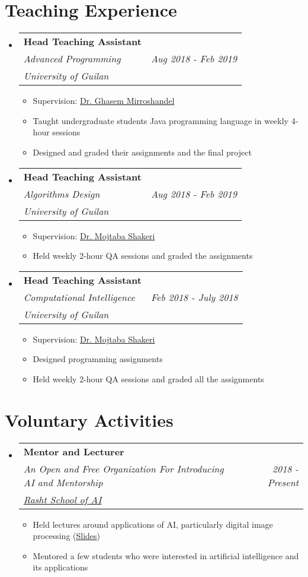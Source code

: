 \documentclass[letterpaper,11pt]{article}
\makeatletter
\newcommand{\resumeItem}[1]{
  \item\small{
    {#1 \vspace{-2pt}}
  }
}
\newcommand{\resumeSubheading}[5]{
  \item
    \begin{tabular*}{0.97\textwidth}{l@{\extracolsep{\fill}}r}
      \textbf{#1} & #2 \\ 
      \textit{\small#3} & \textit{\small #4} \\
      \textit{#5} & 
    \end{tabular*}\vspace{-5pt}
}
\newcommand{\resumeSubHeadingListStart}{\begin{itemize}[leftmargin=*]}
\newcommand{\resumeSubHeadingListEnd}{\end{itemize}}
\newcommand{\resumeItemListStart}{\begin{itemize}}
\newcommand{\resumeItemListEnd}{\end{itemize}\vspace{-5pt}}
\makeatother
\begin{document}
\section{Teaching Experience}
  \resumeSubHeadingListStart
    \resumeSubheading
      {Head Teaching Assistant}{}
      {Advanced Programming} 
      {Aug 2018 - Feb 2019}{University of Guilan}
      \resumeItemListStart
        \resumeItem{Supervision: \href{https://ir.linkedin.com/in/seyed-abolghasem-mirroshandel-1a3a5950}{Dr. Ghasem Mirroshandel}}
        \resumeItem{Taught undergraduate students Java programming language in weekly 4-hour sessions}
        \resumeItem{Designed and graded their assignments and the final project}
      \resumeItemListEnd


    
    \resumeSubheading
      {Head Teaching Assistant}{}
      {Algorithms Design} 
      {Aug 2018 - Feb 2019}{University of Guilan}
      \resumeItemListStart
        \resumeItem{Supervision: \href{https://www.linkedin.com/in/mojtaba-moe-shakeri-b34a2b6/}{Dr. Mojtaba Shakeri}}
        \resumeItem{Held weekly 2-hour QA sessions and graded the assignments}
      \resumeItemListEnd

    \resumeSubheading
      {Head Teaching Assistant}{}
      {Computational Intelligence} 
      {Feb 2018 - July 2018}{University of Guilan}
      \resumeItemListStart
        \resumeItem{Supervision: \href{https://www.linkedin.com/in/mojtaba-moe-shakeri-b34a2b6/}{Dr. Mojtaba Shakeri}}
        \resumeItem{Designed programming assignments}
        \resumeItem{Held weekly 2-hour QA sessions and graded all the assignments}
      \resumeItemListEnd
    
  \resumeSubHeadingListEnd

\section{Voluntary Activities}
  \resumeSubHeadingListStart
    \resumeSubheading
      {Mentor and Lecturer}{}
      {An Open and Free Organization For Introducing AI and Mentorship} 
      {2018 - Present}{\href{http://schoolofai.ir/}{Rasht School of AI}}
      \resumeItemListStart
        \resumeItem{Held lectures around applications of AI, particularly digital image processing (\href{https://github.com/rasht-school-of-ai/Meetup-Materials}{Slides})}
        \resumeItem{Mentored a few students who were interested in artificial intelligence and its applications}
      \resumeItemListEnd
  \resumeSubHeadingListEnd
\end{document}
